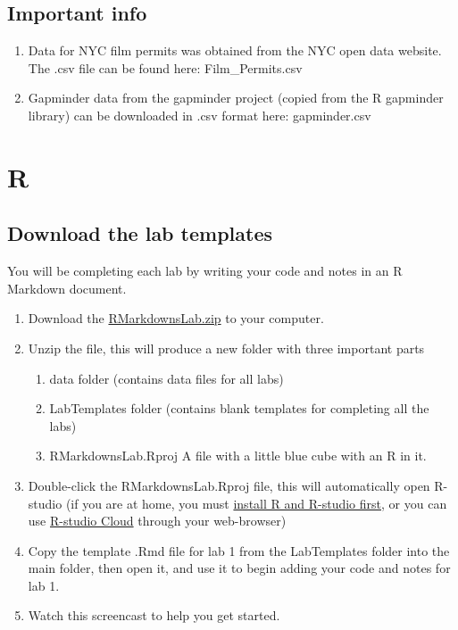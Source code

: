 \documentclass[]{book}
\providecommand{\tightlist}{%
  \setlength{\itemsep}{0pt}\setlength{\parskip}{0pt}}
\begin{document}
\subsection{Important info}\label{important-info}

\begin{enumerate}
\def\labelenumi{\arabic{enumi}.}
\item
  Data for NYC film permits was obtained from the NYC open data website.
  The .csv file can be found here: Film\_Permits.csv
\item
  Gapminder data from the gapminder project (copied from the R gapminder
  library) can be downloaded in .csv format here: gapminder.csv
\end{enumerate}

\section{R}\label{r-1}

\subsection{Download the lab
templates}\label{download-the-lab-templates}

You will be completing each lab by writing your code and notes in an R
Markdown document.

\begin{enumerate}
\def\labelenumi{\arabic{enumi}.}
\tightlist
\item
  Download the
  \href{https://github.com/CrumpLab/statisticsLab/raw/master/RMarkdownsLab.zip}{RMarkdownsLab.zip}
  to your computer.
\item
  Unzip the file, this will produce a new folder with three important
  parts

  \begin{enumerate}
  \def\labelenumii{\alph{enumii}.}
  \tightlist
  \item
    data folder (contains data files for all labs)
  \item
    LabTemplates folder (contains blank templates for completing all the
    labs)
  \item
    RMarkdownsLab.Rproj A file with a little blue cube with an R in it.
  \end{enumerate}
\item
  Double-click the RMarkdownsLab.Rproj file, this will automatically
  open R-studio (if you are at home, you must
  \href{https://crumplab.github.io/statisticsLab/software.html\#installing-r-and-r-studio}{install
  R and R-studio first}, or you can use
  \href{https://crumplab.github.io/statisticsLab/software.html\#r-studio-cloud}{R-studio
  Cloud} through your web-browser)
\item
  Copy the template .Rmd file for lab 1 from the LabTemplates folder
  into the main folder, then open it, and use it to begin adding your
  code and notes for lab 1.
\item
  Watch this screencast to help you get started.
\end{enumerate}
\end{document}
